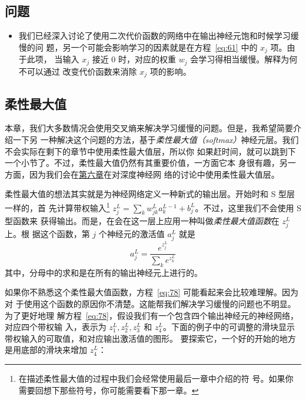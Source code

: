 \subsection*{问题}

\begin{itemize}
\item 我们已经深入讨论了使用二次代价函数的网络中在输出神经元饱和时候学习缓慢的问
  题，另一个可能会影响学习的因素就是在方程~\eqref{eq:61} 中的 $x_j$ 项。由于此项，
  当输入 $x_j$ 接近 $0$ 时，对应的权重 $w_j$ 会学习得相当缓慢。解释为何不可以通过
  改变代价函数来消除 $x_j$ 项的影响。
\end{itemize}

\subsection{柔性最大值}

本章，我们大多数情况会使用交叉熵来解决学习缓慢的问题。但是，我希望简要介绍一下另
一种解决这个问题的方法，基于\emph{柔性最大值（softmax）}神经元层。我们不会实际在剩下的章节中使用柔性最大值层，所以你
如果赶时间，就可以跳到下一个小节了。不过，柔性最大值仍然有其重要价值，一方面它本
身很有趣，另一方面，因为我们会在\hyperref[ch:Deeplearning]{第六章}在对深度神经网
络的讨论中使用柔性最大值层。

柔性最大值的想法其实就是为神经网络定义一种新式的输出层。开始时和 S 型层一样的，首
先计算带权输入\footnote{在描述柔性最大值的过程中我们会经常使用最后一章中介绍的符
  号。如果你需要回想下那些符号，你可能需要看下那一章。}
$z^L_j = \sum_{k} w^L_{jk} a^{L-1}_k + b^L_j$。不过，这里我们不会使用 S 型函数来
获得输出。而是，在会在这一层上应用一种叫做\emph{柔性最大值函数}在 $z^L_j$ 上。根
据这个函数，第 $j$ 个神经元的激活值 $a^L_j$ 就是
\begin{equation} 
  a^L_j = \frac{e^{z^L_j}}{\sum_k e^{z^L_k}}
  \label{eq:78}\tag{78}
\end{equation}
其中，分母中的求和是在所有的输出神经元上进行的。

如果你不熟悉这个柔性最大值函数，方程~\eqref{eq:78} 可能看起来会比较难理解。因为对
于使用这个函数的原因你不清楚。这能帮我们解决学习缓慢的问题也不明显。为了更好地理
解方程~\eqref{eq:78}，假设我们有一个包含四个输出神经元的神经网络，对应四个带权输
入，表示为 $z^L_1, z^L_2, z^L_3$ 和
$z^L_4$。下面的例子中的可调整的滑块显示带权输入的可取值，和对应输出激活值的图形。
要探索它，一个好的开始的地方是用底部的滑块来增加 $z^L_4$：

